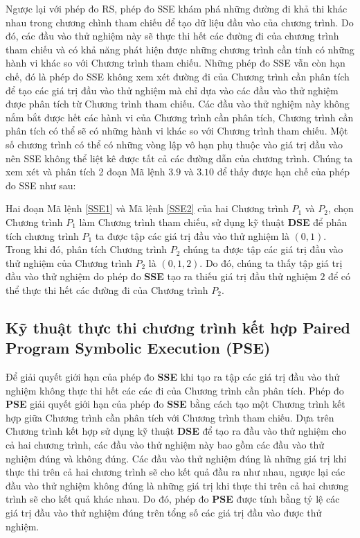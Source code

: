 Ngược lại với phép đo RS, phép đo SSE khám phá những đường đi khả thi khác nhau trong chương chình tham chiếu để tạo dữ liệu đầu vào của chương trình. Do đó, các đầu vào thử nghiệm này sẽ thực thi hết các đường đi của chương trình tham chiếu và có khả năng phát hiện được những chương trình cần tính có những hành vi khác so với Chương trình tham chiếu. Những phép đo SSE vẫn còn hạn chế, đó là phép đo SSE không xem xét đường đi của Chương trình cần phân tích để tạo các giá trị đầu vào thử nghiệm mà chỉ dựa vào các đầu vào thử nghiệm được phân tích từ Chương trình tham chiếu. Các đầu vào thử nghiệm này không nắm bắt được hết các hành vi của Chương trình cần phân tích, Chương trình cần phân tích có thể sẽ có những hành vi khác so với Chương trình tham chiếu. Một số chương trình có thể có những vòng lập vô hạn phụ thuộc vào giá trị đầu vào nên SSE không thể liệt kê được tất cả các đường dẫn của chương trình. Chúng ta xem xét và phân tích 2 đoạn Mã lệnh $3.9$ và $3.10$ để thấy được hạn chế của phép đo SSE như sau:

\begin{minipage}[t]{0.45\linewidth}
	
\end{minipage}%
\hfill\vrule\hfill
\begin{minipage}[t]{0.45\linewidth}
	
\end{minipage}%

Hai đoạn Mã lệnh \ref{SSE1} và Mã lệnh \ref{SSE2} của hai Chương trình $P_{1}$ và $P_{2}$, chọn Chương trình $P_{1}$ làm Chương trình tham chiếu, sử dụng kỹ thuật \textbf{DSE} để phân tích chương trình $P_{1}$ ta được tập các giá trị đầu vào thử nghiệm là ${(0, 1)}$. Trong khi đó, phân tích Chương trình $P_{2}$ chúng ta được tập các giá trị đầu vào thử nghiệm của Chương trình $P_{2}$  là ${(0, 1, 2)}$. Do đó, chúng ta thấy tập giá trị đầu vào thử nghiệm do phép đo \textbf{SSE} tạo ra thiếu giá trị đầu thử nghiệm $2$ để có thể thực thi hết các đường đi của Chương trình $P_{2}$.

\subsection{Kỹ thuật thực thi chương trình kết hợp Paired Program Symbolic Execution (PSE)}
Để giải quyết giới hạn của phép đo \textbf{SSE} khi tạo ra tập các giá trị đầu vào thử nghiệm không thực thi hết các các đi của Chương trình cần phân tích. Phép đo \textbf{PSE} giải quyết giới hạn của phép đo \textbf{SSE} bằng cách tạo một Chương trình kết hợp giữa Chương trình cần phân tích với Chương trình tham chiếu. Dựa trên Chương trình kết hợp sử dụng kỹ thuật \textbf{DSE} để tạo ra đầu vào thử nghiệm cho cả hai chương trình, các đầu vào thử nghiệm này bao gồm các đầu vào thử nghiệm đúng và không đúng. Các đầu vào thử nghiệm đúng là những giá trị khi thực thi trên cả hai chương trình sẽ cho kết quả đầu ra như nhau, ngược lại các đầu vào thử nghiệm không đúng là những giá trị khi thực thi trên cả hai chương trình sẽ cho kết quả khác nhau. Do đó, phép đo \textbf{PSE} được tính bằng tỷ lệ các giá trị đầu vào thử nghiệm đúng trên tổng số các giá trị đầu vào được thử nghiệm. 

